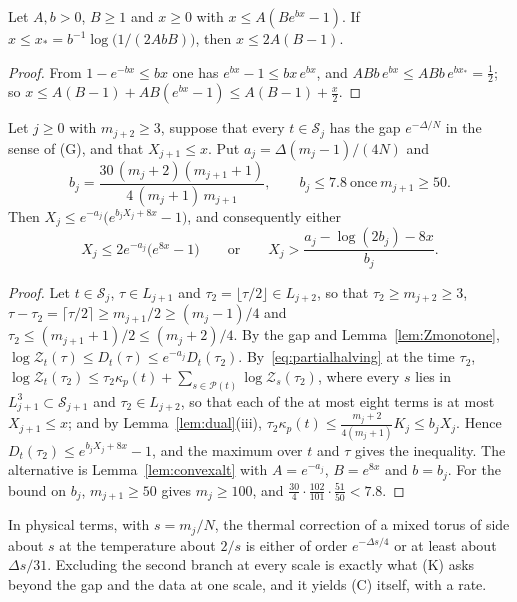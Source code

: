 \begin{lemma}\label{lem:convexalt}
Let $A,b>0$, $B\ge1$ and $x\ge0$ with $x\le A(Be^{bx}-1)$. If $x\le x_*=
b^{-1}\log\bigl(1/(2AbB)\bigr)$, then $x\le2A(B-1)$.
\end{lemma}

\begin{proof}
From $1-e^{-bx}\le bx$ one has $e^{bx}-1\le bx\,e^{bx}$, and $ABb\,e^{bx}\le
ABb\,e^{bx_*}=\frac12$; so $x\le A(B-1)+AB(e^{bx}-1)\le A(B-1)+\frac x2$.
\end{proof}

\begin{proposition}\label{prop:dichotomy}
Let $j\ge0$ with $m_{j+2}\ge3$, suppose that every $t\in\mathcal S_j$ has
the gap $e^{-\Delta/N}$ in the sense of \textup{(G)}, and that $X_{j+1}\le
x$. Put $a_j=\Delta(m_j-1)/(4N)$ and
\[
b_j=\frac{30\,(m_j+2)(m_{j+1}+1)}{4\,(m_j+1)\,m_{j+1}},\qquad b_j\le7.8\ \text{once}\
m_{j+1}\ge50 .
\]
Then $X_j\le e^{-a_j}\bigl(e^{b_jX_j+8x}-1\bigr)$, and consequently either
\[
X_j\le2e^{-a_j}\bigl(e^{8x}-1\bigr)\qquad\text{or}\qquad X_j>\frac{a_j-
\log(2b_j)-8x}{b_j}.
\]
\end{proposition}

\begin{proof}
Let $t\in\mathcal S_j$, $\tau\in L_{j+1}$ and $\tau_2=\lfloor\tau/2\rfloor
\in L_{j+2}$, so that $\tau_2\ge m_{j+2}\ge3$, $\tau-\tau_2=\lceil\tau/2
\rceil\ge m_{j+1}/2\ge(m_j-1)/4$ and $\tau_2\le(m_{j+1}+1)/2\le(m_j+2)/4$.
By the gap and Lemma~\ref{lem:Zmonotone}, $\log\mathcal Z_t(\tau)\le D_t
(\tau)\le e^{-a_j}D_t(\tau_2)$. By~\eqref{eq:partialhalving} at the time
$\tau_2$, $\log\mathcal Z_t(\tau_2)\le\tau_2\kappa_p(t)+\sum_{s\in\mathcal P
(t)}\log\mathcal Z_s(\tau_2)$, where every $s$ lies in $L_{j+1}^3\subset
\mathcal S_{j+1}$ and $\tau_2\in L_{j+2}$, so that each of the at most eight
terms is at most $X_{j+1}\le x$; and by Lemma~\ref{lem:dual}(iii),
$\tau_2\kappa_p(t)\le\frac{m_j+2}{4(m_j+1)}K_j\le b_jX_j$. Hence $D_t
(\tau_2)\le e^{b_jX_j+8x}-1$, and the maximum over $t$ and $\tau$ gives the
inequality. The alternative is Lemma~\ref{lem:convexalt} with $A=e^{-a_j}$,
$B=e^{8x}$ and $b=b_j$. For the bound on $b_j$, $m_{j+1}\ge50$ gives $m_j\ge
100$, and $\frac{30}4\cdot\frac{102}{101}\cdot\frac{51}{50}<7.8$.
\end{proof}

In physical terms, with $s=m_j/N$, the thermal correction of a mixed torus
of side about $s$ at the temperature about $2/s$ is either of order
$e^{-\Delta s/4}$ or at least about $\Delta s/31$. Excluding the second
branch at every scale is exactly what (K) asks beyond the gap and the data
at one scale, and it yields (C) itself, with a rate.

